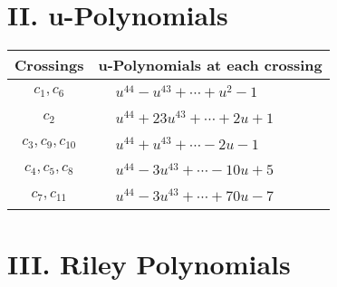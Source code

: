 \documentclass[1p]{elsarticle_modified}
\theoremstyle{definition}
\begin{document}
\newpage\renewcommand{\arraystretch}{1}
\centering \section*{ II. u-Polynomials}
\begin{tabular}{m{50pt}|m{274pt}}
Crossings & \hspace{64pt}u-Polynomials at each crossing \\
\hline $$\begin{aligned}c_{1},c_{6}\end{aligned}$$&$\begin{aligned}
&u^{44}- u^{43}+\cdots+u^2-1
\end{aligned}$\\
\hline $$\begin{aligned}c_{2}\end{aligned}$$&$\begin{aligned}
&u^{44}+23 u^{43}+\cdots+2 u+1
\end{aligned}$\\
\hline $$\begin{aligned}c_{3},c_{9},c_{10}\end{aligned}$$&$\begin{aligned}
&u^{44}+u^{43}+\cdots-2 u-1
\end{aligned}$\\
\hline $$\begin{aligned}c_{4},c_{5},c_{8}\end{aligned}$$&$\begin{aligned}
&u^{44}-3 u^{43}+\cdots-10 u+5
\end{aligned}$\\
\hline $$\begin{aligned}c_{7},c_{11}\end{aligned}$$&$\begin{aligned}
&u^{44}-3 u^{43}+\cdots+70 u-7
\end{aligned}$\\
\hline
\end{tabular}\newpage\renewcommand{\arraystretch}{1}
\centering \section*{ III. Riley Polynomials}
\end{document}
